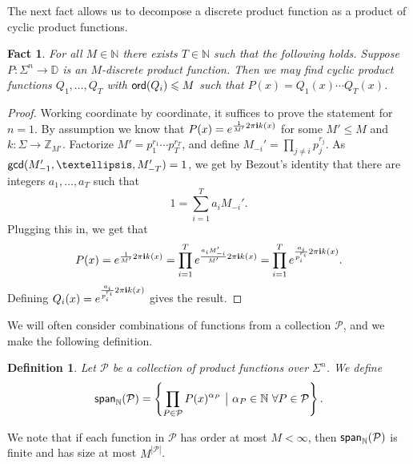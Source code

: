\documentclass[10pt,a4paper]{amsart}
\newtheorem{fact}[thm]{Fact}
\newtheorem{definition}[thm]{Definition}
\newcommand\card[1]{\left| {#1} \right|}
\newcommand\spn{{\sf span}_{\mathbb{N}}}
\renewcommand\leq{\leqslant}
\begin{document}
The next fact allows us to decompose a discrete product function as a product of cyclic product functions.
\begin{fact}\label{fact:break_discrete_to_cyclic}
    For all $M\in\mathbb{N}$ there exists $T\in\mathbb{N}$ such that the following holds.
    Suppose $P\colon \Sigma^{n}\to\mathbb{D}$ is an $M$-discrete product function. Then we may find cyclic product functions $Q_1,\ldots,Q_T$ with ${\sf ord}(Q_i)\leq M$ such that $P(x) = Q_1(x)\cdots Q_T(x)$.
\end{fact}
\begin{proof}
    Working coordinate by coordinate, it suffices to prove the statement for $n=1$. By assumption we know that $P(x) = e^{\frac{1}{M'}2\pi{\bf i} k(x)}$ for some $M'\leq M$ and $k\colon \Sigma\to \mathbb{Z}_{M'}$. Factorize $M' = p_1^{r_1}\cdots p_T^{r_T}$, and define $M_{-i}' = \prod\limits_{j\neq i} p_j^{r_j}$. As ${\sf gcd}(M_{-1}',\ldots,M_{-T}') = 1$, we get by Bezout's identity that there are integers $a_1,\ldots,a_T$ such that
    \[
     1 = \sum\limits_{i=1}^{T} a_i M_{-i}'.
    \]
    Plugging this in, we get that
    \[
    P(x) = e^{\frac{1}{M'}2\pi{\bf i} k(x)}
    =
    \prod\limits_{i=1}^{T}
    e^{\frac{a_i M_{-i}'}{M'}2\pi{\bf i} k(x)}
    =\prod\limits_{i=1}^{T}
    e^{\frac{a_i}{p_i^{r_i}}2\pi{\bf i} k(x)}.
    \]
    Defining $Q_i(x) = e^{\frac{a_i}{p_i^{r_i}}2\pi{\bf i} k(x)}$ gives the result.
\end{proof}

We will often consider combinations of functions from a collection $\mathcal{P}$, and we make the following definition.
\begin{definition}
    Let $\mathcal{P}$ be a collection of product functions over $\Sigma^n$. We define
    \[
    \spn(\mathcal{P})
    =\left\{\prod\limits_{P\in\mathcal{P}}P(x)^{\alpha_{P}}~\big|~\alpha_P\in\mathbb{N}~\forall P\in\mathcal{P}\right\}.
    \]
\end{definition}
We note that if each function in $\mathcal{P}$ has order at most $M<\infty$, then $\spn(\mathcal{P})$ is finite and has size at most $M^{\card{\mathcal{P}}}$.
\end{document}
